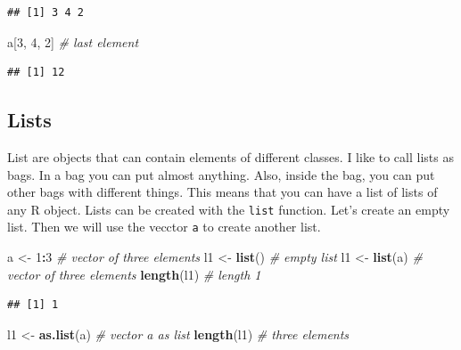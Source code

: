 \documentclass[12pt,graybox,envcountchap,sectrefs]{krantz}
\makeatletter
\newenvironment{Shaded}{\begin{snugshade}}{\end{snugshade}}
\newcommand{\KeywordTok}[1]{\textcolor[rgb]{0.13,0.29,0.53}{\textbf{#1}}}
\newcommand{\DecValTok}[1]{\textcolor[rgb]{0.00,0.00,0.81}{#1}}
\newcommand{\StringTok}[1]{\textcolor[rgb]{0.31,0.60,0.02}{#1}}
\newcommand{\CommentTok}[1]{\textcolor[rgb]{0.56,0.35,0.01}{\textit{#1}}}
\newcommand{\OperatorTok}[1]{\textcolor[rgb]{0.81,0.36,0.00}{\textbf{#1}}}
\newcommand{\NormalTok}[1]{#1}
\newenvironment{kframe}{%
\medskip{}
\setlength{\fboxsep}{.8em}
 \def\at@end@of@kframe{}%
 \ifinner\ifhmode%
  \def\at@end@of@kframe{\end{minipage}}%
  \begin{minipage}{\columnwidth}%
 \fi\fi%
 \def\FrameCommand##1{\hskip\@totalleftmargin \hskip-\fboxsep
 \colorbox{shadecolor}{##1}\hskip-\fboxsep
     \hskip-\linewidth \hskip-\@totalleftmargin \hskip\columnwidth}%
 \MakeFramed {\advance\hsize-\width
   \@totalleftmargin\z@ \linewidth\hsize
   \@setminipage}}%
 {\par\unskip\endMakeFramed%
 \at@end@of@kframe}
\renewenvironment{Shaded}{\begin{kframe}}{\end{kframe}}
\theoremstyle{definition}
\theoremstyle{definition}
\theoremstyle{definition}
\theoremstyle{remark}
\makeatother
\begin{document}
\begin{verbatim}
## [1] 3 4 2
\end{verbatim}

\begin{Shaded}
\begin{Highlighting}[]
\NormalTok{a[}\DecValTok{3}\NormalTok{, }\DecValTok{4}\NormalTok{, }\DecValTok{2}\NormalTok{] }\CommentTok{# last element}
\end{Highlighting}
\end{Shaded}

\begin{verbatim}
## [1] 12
\end{verbatim}

\subsection{Lists}\label{lists}

List are objects that can contain elements of different classes. I like
to call lists as bags. In a bag you can put almost anything. Also,
inside the bag, you can put other bags with different things. This means
that you can have a list of lists of any R object. Lists can be created
with the \texttt{list} function. Let's create an empty list. Then we
will use the vecctor \texttt{a} to create another list.

\begin{Shaded}
\begin{Highlighting}[]
\NormalTok{a <-}\StringTok{ }\DecValTok{1}\OperatorTok{:}\DecValTok{3}          \CommentTok{# vector of three elements}
\NormalTok{l1 <-}\StringTok{ }\KeywordTok{list}\NormalTok{()      }\CommentTok{# empty list}
\NormalTok{l1 <-}\StringTok{ }\KeywordTok{list}\NormalTok{(a)     }\CommentTok{# vector of three elements}
\KeywordTok{length}\NormalTok{(l1)        }\CommentTok{# length 1}
\end{Highlighting}
\end{Shaded}

\begin{verbatim}
## [1] 1
\end{verbatim}

\begin{Shaded}
\begin{Highlighting}[]
\NormalTok{l1 <-}\StringTok{ }\KeywordTok{as.list}\NormalTok{(a)  }\CommentTok{# vector a as list}
\KeywordTok{length}\NormalTok{(l1)        }\CommentTok{# three elements }
\end{Highlighting}
\end{Shaded}
\end{document}
